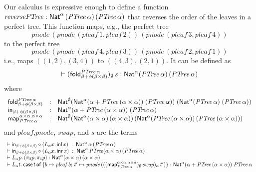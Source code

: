 \documentclass{lmcs}
\theoremstyle{plain}\newtheorem{satz}[thm]{Satz}
\newcommand{\inl}{\mathsf{inl}}
\newcommand{\inr}{\mathsf{inr}}
\newcommand{\fold}{\mathsf{fold}}
\newcommand{\map}{\mathsf{map}}
\begin{document}
\vspace*{0.1in}

Our calculus is expressive enough to define a function
$\mathit{reversePTree :
  \mathsf{Nat}^\alpha\,(\mathit{PTree}\,\alpha)\,(\mathit{PTree}\,\alpha)}$
that reverses the order of the leaves in a perfect tree. This function
maps, e.g., the perfect tree
\[\mathit{pnode}\,(\mathit{pnode}\,
(\mathit{pleaf}\,1,\mathit{pleaf}\,2))\,(\mathit{pnode}\,
(\mathit{pleaf}\,3,\mathit{pleaf}\,4) )\]
to the perfect tree
\[\mathit{pnode}\,(\mathit{pnode}\,
(\mathit{pleaf}\,4,\mathit{pleaf}\,3))\,(\mathit{pnode}\,
(\mathit{pleaf}\,2,\mathit{pleaf}\,1) )\] i.e., maps $((1,2),(3,4))$
to $((4,3),(2,1))$.  It can be defined as
\[\vdash (\fold_{\beta + \phi(\beta \times \beta)}^{\mathit{PTree}\,
  \alpha})_\emptyset \, s : \Nat^{\alpha}
(\mathit{PTree}\,\alpha)\,(\mathit{PTree}\,\alpha)\] where
\[\begin{array}{lll}
\fold_{\beta + \phi(\beta \times \beta)}^{\mathit{PTree}\,\alpha} & :
& \Nat^{\emptyset} (\Nat^{\alpha} (\alpha + \mathit{PTree}\,(\alpha
\times \alpha)) \; (\mathit{PTree}\,\alpha))\; (\Nat^{\alpha}
(\mathit{PTree}\,\alpha) \; (\mathit{PTree}\,\alpha))\\
\tin_{\beta + \phi(\beta \times \beta)} & : & \Nat^{\alpha} (\alpha +
\mathit{PTree}\,(\alpha \times \alpha)) \; (\mathit{PTree}\, \alpha)\\
\map_{\mathit{PTree}\,\alpha}^{\alpha \times \alpha, \alpha \times
  \alpha} & : & \Nat^\emptyset
(\Nat^{\alpha} (\alpha \times \alpha)\, (\alpha \times
\alpha))\,
(\Nat^{\alpha} (\mathit{PTree}\,(\alpha \times
\alpha))\, (\mathit{PTree}\,(\alpha \times \alpha)))
\end{array}\]
and 
$\mathit{pleaf}$,$\mathit{pnode}$, $\mathit{swap}$, and $s$ are the terms
\[\begin{array}{l}
\vdash \tin_{\beta + \phi (\beta \times \beta)} \circ (
L_{\alpha} x.\, \inl\, x) \; : \; \Nat^{\alpha}\, \alpha\,
(\mathit{PTree}\,\alpha)\\ 
\vdash \tin_{\beta + \phi (\beta \times \beta)} \circ (
L_{\alpha} x.\, \inr\, x) \; : \; \Nat^{\alpha}\, \mathit{PTree}
(\alpha \times \alpha)\,(\mathit{PTree}\,\alpha)\\ 
\vdash L_{\alpha} p.\, (\pi_2 p, \pi_1 p) :
\Nat^{\alpha} (\alpha \times \alpha)\, (\alpha \times \alpha)\\
\vdash L_{\alpha} t. \,\cse{t}{b \mapsto
 \mathit{pleaf}\, b}{t' \mapsto \mathit{pnode}\, 
    (((\map_{\mathit{PTree}\,\alpha}^{\alpha \times \alpha, \alpha \times
      \alpha})_\emptyset\, \mathit{swap})_\alpha\, t')}
:  \Nat^{\alpha} (\alpha + \mathit{PTree}\,(\alpha \times
\alpha))\; \mathit{PTree}\,\alpha
\end{array}\]
\end{document}
